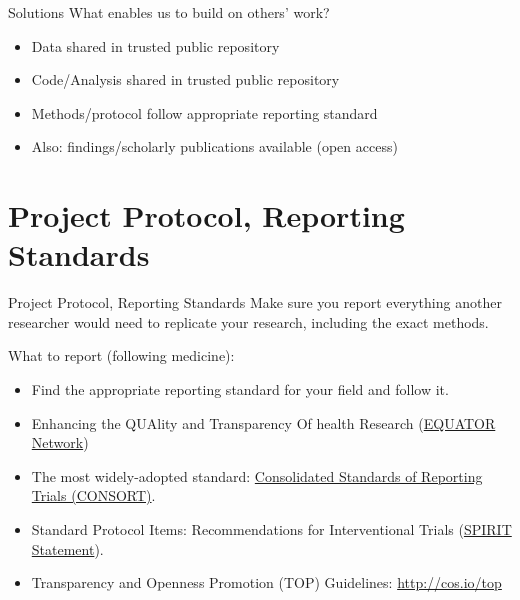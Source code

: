 \documentclass{beamer}
\begin{document}
\begin{frame}{Solutions}
What enables us to build on others' work?
\begin{itemize}[<.->]
 \item Data shared in trusted public repository
 \item Code/Analysis shared in trusted public repository
 \item Methods/protocol follow appropriate reporting standard
 \item Also: findings/scholarly publications available (open access)
\end{itemize}
\end{frame}



\section{Project Protocol, Reporting Standards}
\begin{frame}[<.->]{Project Protocol, Reporting Standards}
 Make sure you report everything another researcher would need to replicate your research, including the exact methods.
 \pause
 
 What to report (following medicine):
\begin{itemize}
\item Find the appropriate reporting standard for your field and follow it.
\item Enhancing the QUAlity and Transparency Of health Research (\href{http://www.equator-network.org}{EQUATOR Network})
\item The most widely-adopted standard: \href{http://www.consort-statement.org}{Consolidated Standards of Reporting Trials (CONSORT)}. 
\item Standard Protocol Items: Recommendations for Interventional Trials (\href{http://www.spirit-statement.org}{SPIRIT Statement}).
\item Transparency and Openness Promotion (TOP) Guidelines: \url{http://cos.io/top}
\end{itemize}
\end{frame}
\end{document}
